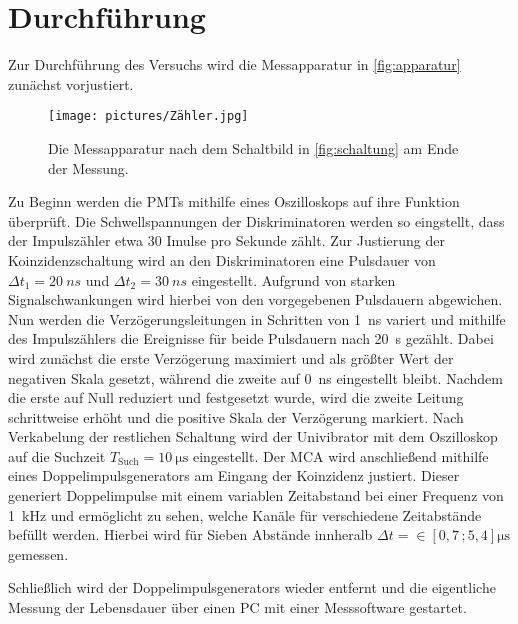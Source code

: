\section{Durchführung}
\label{sec:Durchführung}

Zur Durchführung des Versuchs wird die Messapparatur in \autoref{fig:apparatur} zunächst vorjustiert.
\begin{figure}
    \centering
    \texttt{[image: pictures/Zähler.jpg]}
    \caption{Die Messapparatur nach dem Schaltbild in \autoref{fig:schaltung} am Ende der Messung.}
    \label{fig:apparatur}
\end{figure}
Zu Beginn werden die PMTs mithilfe eines Oszilloskops auf ihre Funktion überprüft.
Die Schwellspannungen der Diskriminatoren werden so eingstellt,
dass der Impulszähler etwa 30 Imulse pro Sekunde zählt.
Zur Justierung der Koinzidenzschaltung wird an den Diskriminatoren eine Pulsdauer von
$\Delta t_1 = \qty{20}{ns}$ und $\Delta t_2 = \qty{30}{ns}$ eingestellt.
Aufgrund von starken Signalschwankungen wird hierbei von den vorgegebenen Pulsdauern \cite{v01} abgewichen.
Nun werden die Verzögerungsleitungen in Schritten von \qty{1}{ns} variert 
und mithilfe des Impulszählers die Ereignisse für beide Pulsdauern nach \qty{20}{s} gezählt.
Dabei wird zunächst die erste Verzögerung maximiert und als größter Wert der negativen Skala gesetzt,
während die zweite auf \qty{0}{ns} eingestellt bleibt.
Nachdem die erste auf Null reduziert und festgesetzt wurde, wird die zweite Leitung schrittweise erhöht 
und die positive Skala der Verzögerung markiert.
Nach Verkabelung der restlichen Schaltung wird der Univibrator mit dem Oszilloskop auf die Suchzeit $T_\text{Such} = \qty{10}{\micro\second}$ eingestellt.
Der MCA wird anschließend mithilfe eines Doppelimpulsgenerators am Eingang der Koinzidenz justiert.
Dieser generiert Doppelimpulse mit einem variablen Zeitabstand bei einer Frequenz von \qty{1}{kHz}
und ermöglicht zu sehen, welche Kanäle für verschiedene Zeitabstände befüllt werden.
Hierbei wird für Sieben Abstände innheralb $\Delta t = \in [0,7 \, ; 5,4] \unit{\micro\second}$ gemessen.


Schließlich wird der Doppelimpulsgenerators wieder entfernt 
und die eigentliche Messung der Lebensdauer über einen PC mit einer Messsoftware gestartet.




